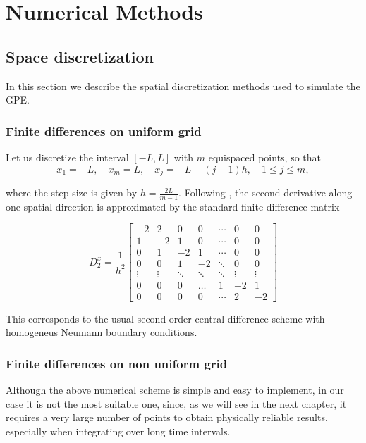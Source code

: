 \chapter{Numerical Methods}

\section{Space discretization}

In this section we describe the spatial discretization methods used to simulate the GPE.

\subsection{Finite differences on uniform grid}

Let us discretize the interval $[-L, L]$ with $m$ equispaced points, so that 
\[
    x_1 = -L, \quad x_m = L, \quad x_j = -L + (j-1)h, \quad 1 \leq j \leq m,
\]

where the step size is given by $h = \tfrac{2L}{m-1}$.  
Following \cite{dispenseCaliari}, the second derivative along one spatial direction is approximated by the standard finite-difference matrix

\[
    D_{2}^x = \frac{1}{h^2}
    \begin{bmatrix}
        -2 & 2  & 0  & 0  & \cdots & 0  & 0 \\
        1 & -2 & 1  & 0  & \cdots & 0  & 0 \\
        0 &  1 & -2 & 1  & \cdots & 0  & 0 \\
        0 &  0 &  1 & -2 & \ddots & 0  & 0 \\
        \vdots & \vdots & \ddots & \ddots & \ddots & \vdots & \vdots \\
        0 &  0 &  0 &  \dots & 1 & -2 & 1 \\
        0 &  0 &  0 &  0 & \cdots &  2 & -2
    \end{bmatrix}
\]

This corresponds to the usual second-order central difference scheme with homogeneus Neumann boundary conditions. 

\subsection{Finite differences on non uniform grid}
\label{sb:nufg}

Although the above numerical scheme is simple and easy to implement, in our case it is not the most suitable one, since, as we will see in the next chapter, it requires a very large number of points to obtain physically reliable results, especially when integrating over long time intervals.  

